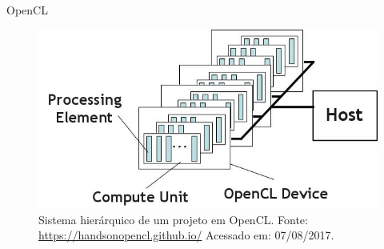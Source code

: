 \begin{frame}{OpenCL}
   \begin{figure}[h] \centering
      \includegraphics[width=1\textwidth]{img/opencl.jpg}
      \caption{Sistema hierárquico de um projeto em OpenCL. Fonte: \url{https://handsonopencl.github.io/} Acessado em: 07/08/2017.}
      \label{fig:opencl}
   \end{figure}
\end{frame}